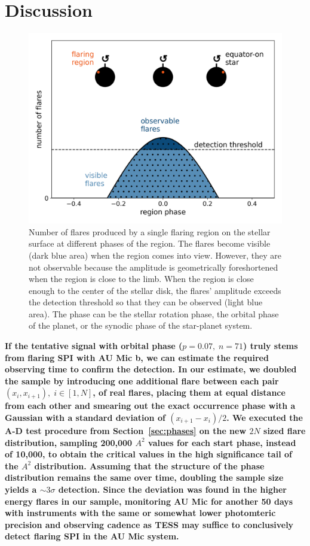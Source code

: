 \documentclass[fleqn,usenatbib]{mnras}%
\begin{document}
\section{Discussion}
\label{sec:discussion}
\begin{figure}
\includegraphics[width=\hsize]{figures/observability_illustration.png} 
\caption{Number of flares produced by a single flaring region on the stellar surface at different phases of the region. The flares become visible (dark blue area) when the region comes into view. However, they are not observable because the amplitude is geometrically foreshortened when the region is close to the limb. When the region is close enough to the center of the stellar disk, the flares' amplitude exceeds the detection threshold so that they can be observed (light blue area). The phase can be the stellar rotation phase, the orbital phase of the planet, or the synodic phase of the star-planet system.}
\label{fig:observability}
\end{figure}

\textbf{If the tentative signal with orbital phase \mbox{($p=0.07,\;n=71$)} truly stems from flaring SPI with AU Mic b, we can estimate the required observing time to confirm the detection. In our estimate, we doubled the sample by introducing one additional flare between each pair $(x_i,x_{i+1}),\;i \in [1,N]$, of real flares, placing them at equal distance from each other and smearing out the exact occurrence phase with a Gaussian with a standard deviation of $(x_{i+1}-x_i)/2$. We executed the A-D test procedure from Section~\ref{sec:phases} on the new $2N$ sized flare distribution, sampling 200,000 $A^2$ values for each start phase, instead of 10,000, to obtain the critical values in the high significance tail of the $A^2$ distribution. Assuming that the structure of the phase distribution remains the same over time, doubling the sample size yields a $\sim3\sigma$ detection. Since the deviation was found in the higher energy flares in our sample, monitoring AU Mic for another 50 days with instruments with the same or somewhat lower photomteric precision and observing cadence as TESS may suffice to conclusively detect flaring SPI in the AU Mic system.} 
\end{document}
